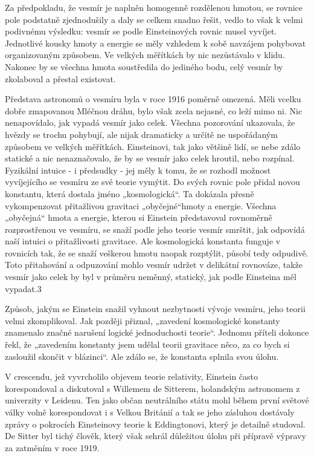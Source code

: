   Za předpokladu, že vesmír je naplněn homogenně rozdělenou hmotou, se rovnice pole podstatně
  zjednodušily a daly se celkem snadno řešit, vedlo to však k velmi podivnému výsledku: vesmír se
  podle Einsteinových rovnic musel vyvíjet. Jednotlivé kousky hmoty a energie se měly vzhledem k
  sobě navzájem pohybovat organizovaným způsobem. Ve velkých měřítkách by nic nezůstávalo v klidu.
  Nakonec by se všechna hmota soustředila do jediného bodu, celý vesmír by zkolaboval a přestal
  existovat. 
  
  Představa astronomů o vesmíru byla v roce 1916 poměrně omezená. Měli vcelku dobře zmapovanou
  Mléčnou dráhu, bylo však zcela nejasné, co leží mimo ni. Nic nenapovídalo, jak vypadá vesmír jako
  celek. Všechna pozorování ukazovala, že hvězdy se trochu pohybují, ale nijak dramaticky a určitě
  ne uspořádaným způsobem ve velkých měřítkách. Einsteinovi, tak jako většině lidí, se nebe zdálo
  statické a nic nenaznačovalo, že by se vesmír jako celek hroutil, nebo rozpínal. Fyzikální intuice
  - i předsudky - jej měly k tomu, že se rozhodl možnost vyvíjejícího se vesmíru ze své teorie
  vymýtit. Do svých rovnic pole přidal novou konstantu, která dostala jméno „kosmologická“. Ta
  dokázala přesně vykompenzovat přitažlivou gravitaci „obyčejné“hmoty a energie. Všechna „obyčejná“
  hmota a energie, kterou si Einstein představoval rovnoměrně rozprostřenou ve vesmíru, se snaží
  podle jeho teorie vesmír smrštit, jak odpovídá naší intuici o přitažlivosti gravitace. Ale
  kosmologická konstanta funguje v rovnicích tak, že se snaží veškerou hmotu naopak rozptýlit,
  působí tedy odpudivě. Toto přitahování a odpuzování mohlo vesmír udržet v delikátní rovnováze,
  takže vesmír jako celek by byl v průměru neměnný, statický, jak podle Einsteina měl vypadat.3
  
  Způsob, jakým se Einstein snažil vyhnout nezbytnosti vývoje vesmíru, jeho teorii velmi
  zkomplikoval. Jak později přiznal, „zavedení kosmologické konstanty znamenalo značné narušení
  logické jednoduchosti teorie“. Jednomu příteli dokonce řekl, že „zavedením konstanty jsem udělal
  teorii gravitace něco, za co bych si zasloužil skončit v blázinci“. Ale zdálo se, že konstanta
  splnila svou úlohu. 
  
  V crescendu, jež vyvrcholilo objevem teorie relativity, Einstein často korespondoval a diskutoval
  s Willemem de Sitterem, holandským astronomem z univerzity v Leidenu. Ten jako občan neutrálního
  státu mohl během první světové války volně korespondovat i s Velkou Británií a tak se jeho
  zásluhou dostávaly zprávy o pokrocích Einsteinovy teorie k Eddingtonovi, který je detailně
  studoval. De Sitter byl tichý člověk, který však sehrál důležitou úlohu při přípravě výpravy za
  zatměním v roce 1919. 
  

